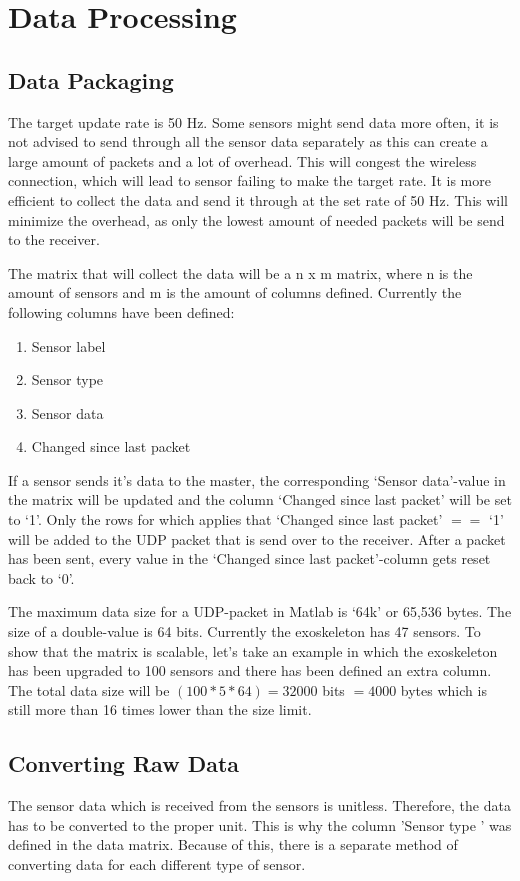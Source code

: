 \section{Data Processing}\label{sec:dataproc}
\subsection{Data Packaging}
The target update rate is 50 Hz. Some sensors might send data more often, it is not advised to send through all the sensor data separately as this can create a large amount of packets and a lot of overhead. This will congest the wireless connection, which will lead to sensor failing to make the target rate. It is more efficient to collect the data and send it through at the set rate of 50 Hz. This will minimize the overhead, as only the lowest amount of needed packets will be send to the receiver.

The matrix that will collect the data will be a n x m matrix, where n is the amount of sensors and m is the amount of columns defined. Currently the following columns have been defined:\\
\begin{enumerate}
	\item Sensor label
	\item Sensor type
	\item Sensor data
	\item Changed since last packet
\end{enumerate}
If a sensor sends it's data to the master, the corresponding `Sensor data'-value in the matrix will be updated and the column `Changed since last packet' will be set to `1'. Only the rows for which applies that `Changed since last packet' $==$ `1' will be added to the UDP packet that is send over to the receiver. After a packet has been sent, every value in the `Changed since last packet'-column gets reset back to `0'.

The maximum data size for a UDP-packet in Matlab is `64k' or 65,536 bytes. The size of a double-value is 64 bits. Currently the exoskeleton has 47 sensors. To show that the matrix is scalable, let's take an example in which the exoskeleton has been upgraded to 100 sensors and there has been defined an extra column. The total data size will be $(100*5*64) = 32000$ bits $= 4000$ bytes which is still more than 16 times lower than the size limit. 

\subsection{Converting Raw Data}
The sensor data which is received from the sensors is unitless. Therefore, the data has to be converted to the proper unit. This is why the column 'Sensor type ' was defined in the data matrix. Because of this, there is a separate method of converting data for each different type of sensor. 